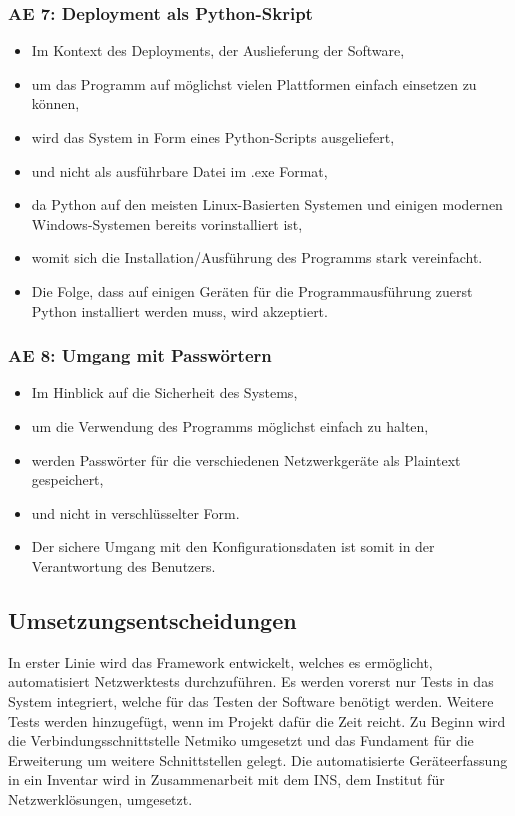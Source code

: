 \documentclass[
	ngerman,
	toc=listof, %
	toc=bibliography, %
	footnotes=multiple, %
	parskip=half, %
	numbers=noendperiod %
]{scrartcl}
\begin{document}
		\subsubsection{AE 7: Deployment als Python-Skript}
		\begin{itemize}
			\item Im Kontext des Deployments, der Auslieferung der Software,
			\item um das Programm auf möglichst vielen Plattformen einfach einsetzen zu können,
			\item wird das System in Form eines Python-Scripts ausgeliefert,
			\item und nicht als ausführbare Datei im .exe Format,
			\item da Python auf den meisten Linux-Basierten Systemen und einigen modernen Windows-Systemen bereits vorinstalliert ist,
			\item womit sich die Installation/Ausführung des Programms stark vereinfacht.
			\item Die Folge, dass auf einigen Geräten für die Programmausführung zuerst Python installiert werden muss, wird akzeptiert.
		\end{itemize}

		\subsubsection{AE 8: Umgang mit Passwörtern}
		\begin{itemize}
			\item Im Hinblick auf die Sicherheit des Systems,
			\item um die Verwendung des Programms möglichst einfach zu halten,
			\item werden Passwörter für die verschiedenen Netzwerkgeräte als Plaintext gespeichert,
			\item und nicht in verschlüsselter Form.
			\item Der sichere Umgang mit den Konfigurationsdaten ist somit in der Verantwortung des Benutzers.
		\end{itemize}

	\subsection{Umsetzungsentscheidungen}
	In erster Linie wird das Framework entwickelt, welches es ermöglicht, automatisiert Netzwerktests durchzuführen.
	Es werden vorerst nur Tests in das System integriert, welche für das Testen der Software benötigt werden.
	Weitere Tests werden hinzugefügt, wenn im Projekt dafür die Zeit reicht.
	Zu Beginn wird die Verbindungsschnittstelle Netmiko umgesetzt und das Fundament für die Erweiterung um weitere Schnittstellen gelegt.
	Die automatisierte Geräteerfassung in ein Inventar wird in Zusammenarbeit mit dem INS, dem Institut für Netzwerklösungen, umgesetzt.
\end{document}
